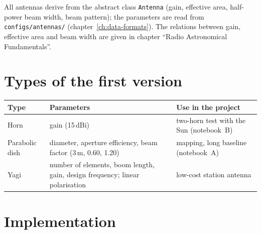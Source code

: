 
All antennas derive from the abstract class \texttt{Antenna} (gain,
effective area, half-power beam width, beam pattern); the parameters are
read from \texttt{configs/antennas/} (chapter~\ref{ch:data-formats}).
The relations between gain, effective area and beam width are given in
chapter \enquote{Radio Astronomical Fundamentals}.

\section{Types of the first version}

\begin{center}
\begin{tabular}{@{}l>{\raggedright\arraybackslash}p{5.0cm}>{\raggedright\arraybackslash}p{5.6cm}@{}}
\toprule
Type & Parameters & Use in the project \\
\midrule
Horn & gain (15\,dBi) & two-horn test with the Sun (notebook~B) \\
Parabolic dish & diameter, aperture efficiency, beam factor
  (3\,m, 0.60, 1.20) & mapping, long baseline (notebook~A) \\
Yagi & number of elements, boom length, gain, design frequency;
  linear polarisation & low-cost station antenna \\
\bottomrule
\end{tabular}
\end{center}

\section{Implementation}
\label{sec:antennas-impl}


